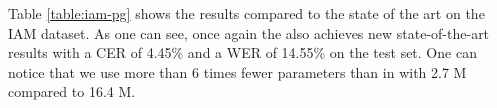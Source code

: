 \begin{table}[!h]
    \caption{Recognition results  of the \modelacc{} and comparison with paragraph-level state-of-the-art approaches on the RIMES dataset.}
    \centering
    \label{table:rimes-pg}
\end{table}

Table \ref{table:iam-pg} shows the results compared to the state of the art on the IAM dataset. As one can see, once again the \modelacc{} also achieves new state-of-the-art results with a CER of 4.45\% and a WER of 14.55\% on the test set. One can notice that we use more than 6 times fewer parameters than in \cite{Yousef2020} with 2.7 M compared to 16.4 M.


